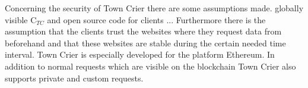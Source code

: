 \documentclass[conference]{IEEEtran}
\begin{document}
Concerning the security of Town Crier there are some assumptions made. globally visible C$_{TC}$ and open source code for clients ... Furthermore there is the assumption that the clients trust the websites where they request data from beforehand and that these websites are stable during the certain needed time interval.
Town Crier is especially developed for the platform Ethereum.
In addition to normal requests which are visible on the blockchain Town Crier also supports private and custom requests. \cite{Zhang2016}
%
%



%
%
\end{document}
